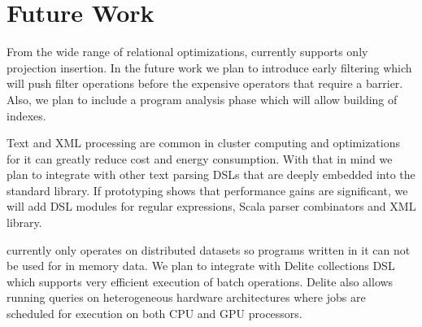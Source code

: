 \section{Future Work}
\label{sec:future-work}

From the wide range of relational optimizations, \tool currently supports only
 projection insertion. In the future work we plan to introduce early filtering
 which will push filter operations before the expensive operators that require a
barrier. Also, we plan to include a program analysis phase which will allow
building of indexes.

Text and XML processing are common in cluster computing and optimizations for
it can greatly reduce cost and energy consumption. With that in mind we plan to
integrate \tool with other text parsing DSLs that are deeply embedded into the
standard library. If prototyping shows that performance gains are significant,
we will add DSL modules for regular expressions, Scala parser combinators and XML library.

\tool currently only operates on distributed datasets so programs written in it
can not be used for in memory data. We plan to integrate \tool with Delite
\cite{brown_heterogeneous_2011} collections DSL which supports very efficient
execution of batch operations. Delite also allows running queries on
heterogeneous hardware architectures where jobs are scheduled for execution on
both CPU and GPU processors.
\\
